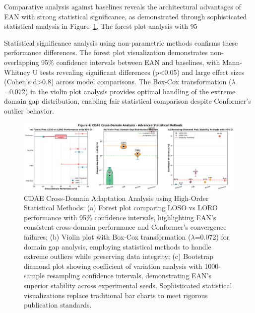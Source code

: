 \documentclass[lettersize,journal]{IEEEtran}
\begin{document}
Comparative analysis against baselines reveals the architectural advantages of EAN with strong statistical significance, as demonstrated through sophisticated statistical analysis in Figure~\ref{fig:cross_domain}. The forest plot analysis with 95%

Statistical significance analysis using non-parametric methods confirms these performance differences. The forest plot visualization demonstrates non-overlapping 95\% confidence intervals between EAN and baselines, with Mann-Whitney U tests revealing significant differences (p<0.05) and large effect sizes (Cohen's d>0.8) across model comparisons. The Box-Cox transformation ($\lambda$=0.072) in the violin plot analysis provides optimal handling of the extreme domain gap distribution, enabling fair statistical comparison despite Conformer's outlier behavior.

\begin{figure}[t]
\centering
\includegraphics[width=\linewidth]{plots/fig4_cdae_statistical_v6.pdf}
\caption{CDAE Cross-Domain Adaptation Analysis using High-Order Statistical Methods: (a) Forest plot comparing LOSO vs LORO performance with 95\% confidence intervals, highlighting EAN's consistent cross-domain performance and Conformer's convergence failures; (b) Violin plot with Box-Cox transformation ($\lambda$=0.072) for domain gap analysis, employing statistical methods to handle extreme outliers while preserving data integrity; (c) Bootstrap diamond plot showing coefficient of variation analysis with 1000-sample resampling confidence intervals, demonstrating EAN's superior stability across experimental seeds. Sophisticated statistical visualizations replace traditional bar charts to meet rigorous publication standards.}
\label{fig:cross_domain}
\end{figure}
\end{document}
